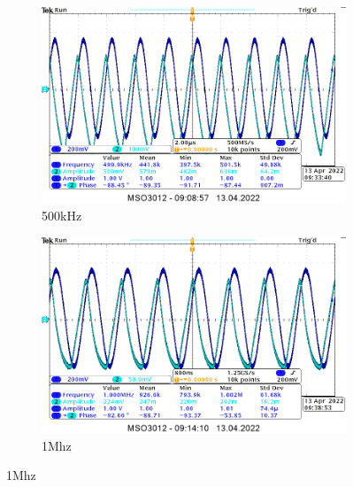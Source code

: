 \begin{itemize}
{        \begin{figure}[H]
            \centering
            \begin{subfigure}[h]{0.4\textwidth}
                \includegraphics[width=\textwidth]{img/osciloscope/charakterystyka/1_500khz_cropped.png}
                \caption*{500kHz}
            \end{subfigure}
            \begin{subfigure}[h]{0.4\textwidth}
                \includegraphics[width=\textwidth]{img/osciloscope/charakterystyka/1_1mhz_cropped.png}
                \caption*{1Mhz}
            \end{subfigure}
        \end{figure}
        }
    \pagebreak
    

\end{itemize}
